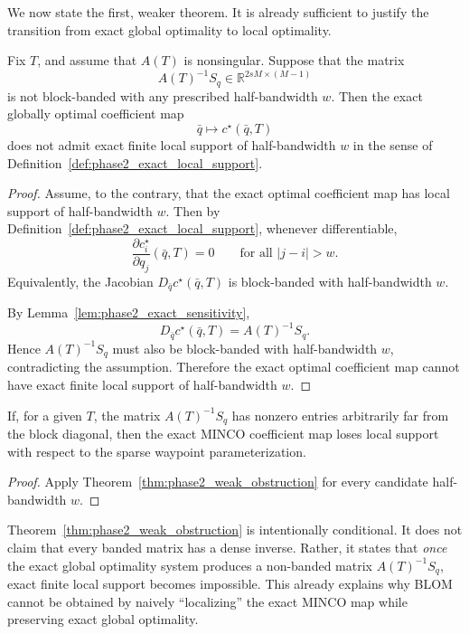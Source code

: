 We now state the first, weaker theorem.
It is already sufficient to justify the transition from exact global optimality to local optimality.

\begin{theorem}
\label{thm:phase2_weak_obstruction}
Fix \(T\), and assume that \(A(T)\) is nonsingular.
Suppose that the matrix
\[
A(T)^{-1}S_q \in \mathbb R^{2sM\times(M-1)}
\]
is not block-banded with any prescribed half-bandwidth \(w\).
Then the exact globally optimal coefficient map
\[
\bar q\longmapsto c^\star(\bar q,T)
\]
does not admit exact finite local support of half-bandwidth \(w\) in the sense of Definition~\ref{def:phase2_exact_local_support}.
\end{theorem}

\begin{proof}
Assume, to the contrary, that the exact optimal coefficient map has local support of half-bandwidth \(w\).
Then by Definition~\ref{def:phase2_exact_local_support}, whenever differentiable,
\[
\frac{\partial c_i^\star}{\partial q_j}(\bar q,T)=0
\qquad \text{for all } |j-i|>w.
\]
Equivalently, the Jacobian \(D_{\bar q}c^\star(\bar q,T)\) is block-banded with half-bandwidth \(w\).

By Lemma~\ref{lem:phase2_exact_sensitivity},
\[
D_{\bar q}c^\star(\bar q,T)=A(T)^{-1}S_q.
\]
Hence \(A(T)^{-1}S_q\) must also be block-banded with half-bandwidth \(w\), contradicting the assumption.
Therefore the exact optimal coefficient map cannot have exact finite local support of half-bandwidth \(w\).
\end{proof}

\begin{corollary}
\label{cor:phase2_minco_no_local_support}
If, for a given \(T\), the matrix \(A(T)^{-1}S_q\) has nonzero entries arbitrarily far from the block diagonal, then the exact MINCO coefficient map loses local support with respect to the sparse waypoint parameterization.
\end{corollary}

\begin{proof}
Apply Theorem~\ref{thm:phase2_weak_obstruction} for every candidate half-bandwidth \(w\).
\end{proof}

\begin{remark}[Interpretation]
\label{rem:phase2_interpretation}
Theorem~\ref{thm:phase2_weak_obstruction} is intentionally conditional.
It does not claim that every banded matrix has a dense inverse.
Rather, it states that \emph{once} the exact global optimality system produces a non-banded matrix \(A(T)^{-1}S_q\), exact finite local support becomes impossible.
This already explains why BLOM cannot be obtained by naively ``localizing'' the exact MINCO map while preserving exact global optimality.
\end{remark}

